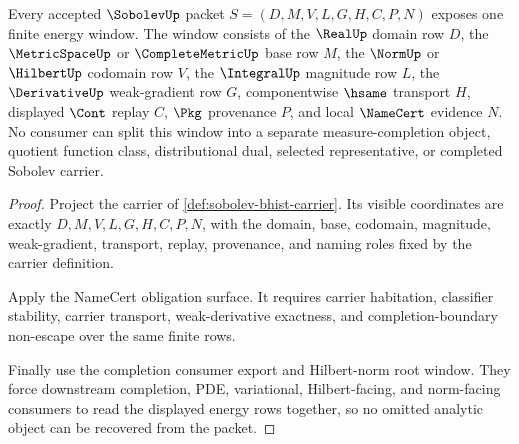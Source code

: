 \begin{theorem}
\label{thm:sobolev-carrier-energy-window}
Every accepted $\SobolevUp$ packet $S=(D,M,V,L,G,H,C,P,N)$ exposes one finite energy window. The window consists of the $\RealUp$ domain row $D$, the $\MetricSpaceUp$ or $\CompleteMetricUp$ base row $M$, the $\NormUp$ or $\HilbertUp$ codomain row $V$, the $\IntegralUp$ magnitude row $L$, the $\DerivativeUp$ weak-gradient row $G$, componentwise $\hsame$ transport $H$, displayed $\Cont$ replay $C$, $\Pkg$ provenance $P$, and local $\NameCert$ evidence $N$. No consumer can split this window into a separate measure-completion object, quotient function class, distributional dual, selected representative, or completed Sobolev carrier.
\end{theorem}
\begin{proof}
Project the carrier of \autoref{def:sobolev-bhist-carrier}. Its visible coordinates are exactly $D,M,V,L,G,H,C,P,N$, with the domain, base, codomain, magnitude, weak-gradient, transport, replay, provenance, and naming roles fixed by the carrier definition.

Apply the NameCert obligation surface. It requires carrier habitation, classifier stability, carrier transport, weak-derivative exactness, and completion-boundary non-escape over the same finite rows.

Finally use the completion consumer export and Hilbert-norm root window. They force downstream completion, PDE, variational, Hilbert-facing, and norm-facing consumers to read the displayed energy rows together, so no omitted analytic object can be recovered from the packet.
\end{proof}

